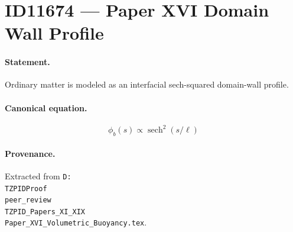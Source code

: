 \section*{ID11674 --- Paper XVI Domain Wall Profile}

\paragraph{Statement.}
Ordinary matter is modeled as an interfacial sech-squared domain-wall profile.

\paragraph{Canonical equation.}
\[
\phi_b(s)\propto\operatorname{sech}^2(s/\ell)
\]

\paragraph{Provenance.}
Extracted from \texttt{D:\\TZPIDProof\\peer\_review\\TZPID\_Papers\_XI\_XIX\\Paper\_XVI\_Volumetric\_Buoyancy.tex}.
